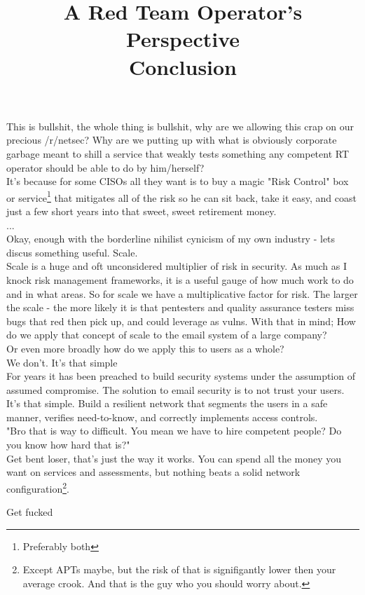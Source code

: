 \documentclass[10pt,a4paper]{article}
\begin{document}
\begin{flushleft}
			\title{\huge{A Red Team Operator's Perspective\\}}
			\vspace{5 mm}
			{\normalsize This is bullshit, the whole thing is bullshit, why are we allowing this crap on our precious /r/netsec? Why are we putting up with what is obviously corporate garbage meant to shill a service that weakly tests something any competent RT operator should be able to do by him/herself?\\
			\vspace{2.5 mm}
			It's because for some CISOs all they want is to buy a magic "Risk Control" box or service\footnote{Preferably both} that mitigates all of the risk so he can sit back, take it easy, and coast just a few short years into that sweet, sweet retirement money.\\
			\vspace{2.5 mm}
			...\\
			\vspace{2.5 mm}
			Okay, enough with the borderline nihilist cynicism of my own industry - lets discus something useful. Scale.\\
			\vspace{2.5 mm}
			Scale is a huge and oft unconsidered multiplier of risk in security. As much as I knock risk management frameworks, it is a useful gauge of how much work to do and in what areas. So for scale we have a multiplicative factor for risk. The larger the scale - the more likely it is that pentesters and quality assurance testers miss bugs that red then pick up, and could leverage as vulns. With that in mind; How do we apply that concept of scale to the email system of a large company?\\
			\vspace{5 mm}
			Or even more broadly how do we apply this to users as a whole?\\
			\vspace{5 mm}
			We don't. It's that simple\\
			\vspace{5 mm}
			For years it has been preached to build security systems under the assumption of assumed compromise. The solution to email security is to not trust your users. It's that simple. Build a resilient network that segments the users in a safe manner, verifies need-to-know, and correctly implements access controls. \\
			\vspace{3 mm}
			"Bro that is way to difficult. You mean we have to hire competent people? Do you know how hard that is?"\\
			\vspace{2.5 mm}
			Get bent loser, that's just the way it works. You can spend all the money you want on services and assessments, but nothing beats a solid network configuration\footnote{Except APTs maybe, but the risk of that is signifigantly lower then your average crook. And that is the guy who you should worry about.}.\\ 
			}
			\pagebreak
			\title{\huge{Conclusion\\}}
			\vspace{5 mm}
			{\normalsize Get fucked}
		\end{flushleft}
		\vfill
\end{document}
